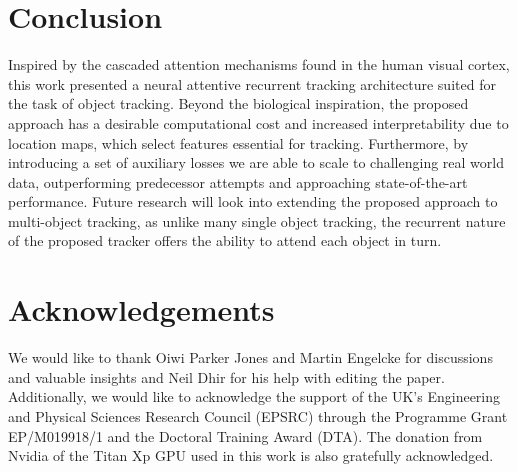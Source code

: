 \section{Conclusion}
\label{sec:conclusion}
    
    Inspired by the cascaded attention mechanisms found in the human visual cortex, this work presented a neural attentive recurrent tracking architecture suited for the task of object tracking. Beyond the biological inspiration, the proposed approach has a desirable computational cost and increased interpretability due to location maps, which select features essential for tracking. Furthermore, by introducing a set of auxiliary losses we are able to scale to challenging real world data, outperforming predecessor attempts and approaching state-of-the-art performance. Future research will look into extending the proposed approach to multi-object tracking, as unlike many single object tracking, the recurrent nature of the proposed tracker offers the ability to attend each object in turn. 
  
\section*{Acknowledgements}
    
  We would like to thank Oiwi Parker Jones and Martin Engelcke for discussions and valuable insights and Neil Dhir for his help with editing the paper. Additionally, we would like to acknowledge the support of the UK’s Engineering and Physical Sciences Research Council (EPSRC) through the Programme Grant EP/M019918/1 and the Doctoral Training Award (DTA). The donation from Nvidia of the Titan Xp GPU used in this work is also gratefully acknowledged.